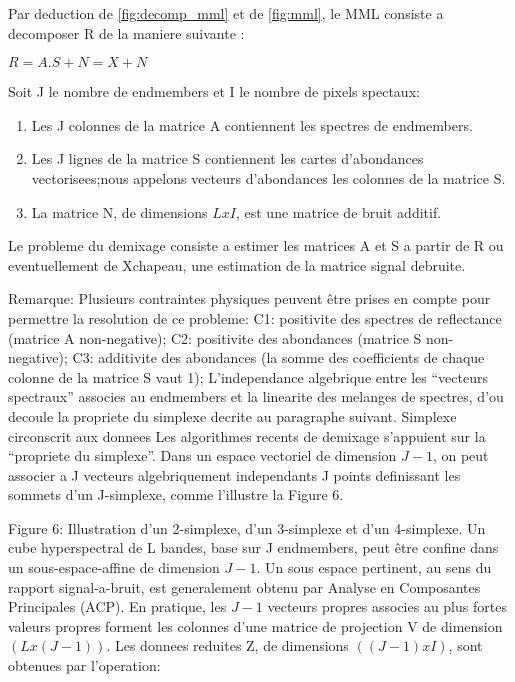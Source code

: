 Par deduction de \ref{fig:decomp_mml} et de \ref{fig:mml}, le MML consiste a decomposer R
de la maniere suivante : 
\begin{center}
$R= A.S + N = X + N$
\end{center}

Soit J le nombre de endmembers et I le nombre de pixels spectaux: 
\begin{enumerate}
\item{Les J colonnes de la matrice A contiennent les spectres de endmembers.}
\item{Les J lignes de la matrice S contiennent les cartes d'abondances
vectorisees;nous appelons vecteurs d'abondances les colonnes de la
matrice S.}
\item{La matrice N, de dimensions $LxI$, est une matrice de bruit
additif.}
\end{enumerate}

   

Le probleme du demixage consiste a estimer les matrices A et S a
partir de R ou eventuellement de Xchapeau, une estimation de la matrice signal
debruite.

Remarque: Plusieurs contraintes physiques peuvent être prises en
compte pour permettre la resolution de ce probleme: 
C1: positivite
des spectres de reflectance (matrice A non-negative); 
C2: positivite
des abondances (matrice S non-negative); 
C3: additivite des
abondances (la somme des coefficients de chaque colonne de la matrice
S vaut 1); 
L'independance algebrique entre les ``vecteurs spectraux''
associes au endmembers et la linearite des melanges de spectres, d'ou
decoule la propriete du simplexe decrite au paragraphe suivant.
Simplexe circonscrit aux donnees Les algorithmes recents de demixage
s'appuient sur la ``propriete du simplexe''. Dans un espace vectoriel
de dimension $J-1$, on peut associer a J vecteurs algebriquement
independants J points definissant les sommets d'un J-simplexe, comme
l'illustre la Figure 6.

Figure 6: Illustration d'un 2-simplexe, d'un 3-simplexe et d'un
4-simplexe.  Un cube hyperspectral de L bandes, base sur J endmembers,
peut être confine dans un sous-espace-affine de dimension $J-1$.  Un
sous espace pertinent, au sens du rapport signal-a-bruit, est
generalement obtenu par Analyse en Composantes Principales (ACP). En
pratique, les $J-1$ vecteurs propres associes au plus fortes valeurs
propres forment les colonnes d'une matrice de projection V de
dimension $(Lx(J-1))$. Les donnees reduites Z, de dimensions $((J-1)xI)$,
sont obtenues par l'operation:

